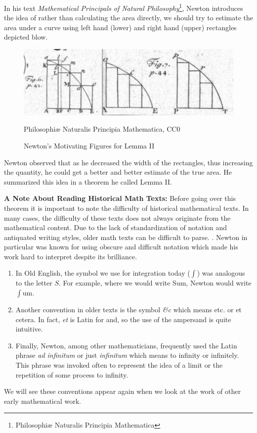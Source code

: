 \documentclass{article}
\theoremstyle{axiom} \newtheorem{axiom}{Axiom}
\theoremstyle{definition} \newtheorem{definition}{Definition}
\theoremstyle{example} \newtheorem{example}{Example}
\theoremstyle{proposition} \newtheorem{prop}{Proposition}
\theoremstyle{lemma} \newtheorem{lemma}{Lemma}
\begin{document}
In his text \textit{Mathematical Principals of Natural Philosophy}\footnote{
Philosophiæ Naturalis Principia Mathematica}, Newton introduces the idea of rather than 
calculating the area directly, we should try to estimate the area 
under a curve using left hand (lower) and right hand (upper) rectangles depicted
blow.
\begin{figure}[H]
	\centering
	\includegraphics[scale=0.7]{img/newtons-fig.png}
	\caption{Newton's Motivating Figures for Lemma II}
	\tiny{Philosophiæ Naturalis Principia Mathematica, CC0}
\end{figure}

Newton observed that as he decreased the width of the rectangles, thus increasing
the quantity, he could get a better and better estimate of the true area. He
summarized this idea in a theorem he called Lemma II. 

\textbf{A Note About Reading Historical Math Texts:} Before going over this 
theorem it is important to note the difficulty of historical 
mathematical texts. In many cases, the difficulty of these texts does not always
originate from the mathematical content. Due to the lack of standardization of notation
and antiquated writing styles, older math texts can be difficult to parse. \cite{bourne:2010}.
Newton in particular was known for using obscure and difficult notation which made 
his work hard to interpret despite its brilliance. 
\begin{enumerate}
	\item In Old English, the symbol we use for integration today ($\int$) was 
		analogous to the letter $S$. For example, where we would write Sum, Newton 
		would write $\int$um. 	
	\item Another convention in older texts is the symbol \textit{\&c} which means 
		etc. or et cetera. In fact, \textit{et} is Latin for and, so the use
		of the ampersand is quite intuitive.
	\item Finally, Newton, among other mathematicians, frequently used the
		Latin phrase \textit{ad infinitum} or just \textit{infinitum} which means
		to infinity or infinitely. This phrase was invoked often to represent the idea
		of a limit or the repetition of some process to infinity. 
\end{enumerate}
We will see these conventions appear again when we look at the work of other early
mathematical work. 
\end{document}
